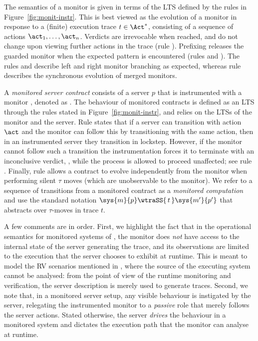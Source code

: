 The semantics of a monitor is given in terms of the LTS defined by the rules in Figure~\ref{fig:monit-instr}. This is best viewed as the evolution of a monitor in response to a (finite) execution trace $t \in \Act^\ast$, consisting of a sequence of actions $\act_1,\ldots,\act_n$.  Verdicts are irrevocable when reached, and do not change upon viewing further actions in the trace (rule ). Prefixing releases the guarded monitor when the expected pattern is encountered (rules  and ). The rules   and  describe left and right monitor branching as expected, whereas rule  describes the synchronous evolution of merged monitors.

A \emph{monitored server contract} consists of a server $p$ that is instrumented with a monitor \mV, denoted as .  The behaviour of monitored contracts is defined as an LTS through the rules stated in Figure~\ref{fig:monit-instr}, and relies on the \resp LTSs of the monitor and the server.  Rule  states that if a server can transition with action $\act$ and the  monitor can follow this by transitioning with the same action, then in an instrumented server  they transition in lockstep. However, if the monitor cannot follow such a transition the instrumentation forces it to terminate with an inconclusive verdict, \stp, while the process is allowed to proceed unaffected; see rule .  Finally, rule  allows a contract to evolve independently from the monitor when performing silent $\tau$ moves (which are unobservable to the monitor).  We refer to a sequence of transitions from a monitored contract as a \emph{monitored computation} and use the standard notation $\sys{m}{p} \wtraSS{\,t\,} \sys{m'}{p'}$ that abstracts over $\tau$-moves in trace $t$. 

A few comments are in order.  First, we highlight the fact that in the operational semantics for monitored systems of ,  the monitor does \emph{not} have access to the internal state of the server generating the trace, and its observations are limited to the execution that the server chooses to exhibit at runtime.  This is meant to model the RV scenarios mentioned in , where the source of the executing  system cannot be analysed: from the point of view of the runtime monitoring and verification, the server description is merely used to generate traces.  Second, we note that, in a monitored server setup, any visible behaviour is instigated by the server, relegating the instrumented monitor to a \emph{passive} role that merely follows the server actions. Stated otherwise, the server  \emph{drives} the behaviour in a monitored system  and dictates  the execution path that the monitor can analyse at runtime.

